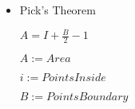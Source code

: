 \begin{itemize}
\item Pick’s Theorem

$A = I+\frac{B}{2}-1$

$A:=Area$

$i:=PointsInside$

$B:=PointsBoundary$

\end{itemize}
